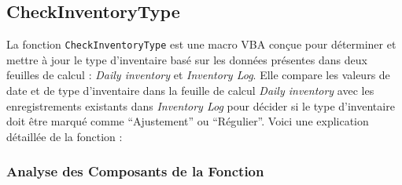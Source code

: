 \documentclass[a4paper, oneside, 12pt, final]{extreport}
\begin{document}
\subsection{CheckInventoryType}

La fonction \texttt{CheckInventoryType} est une macro VBA conçue pour déterminer et mettre à jour le type d'inventaire basé sur les données présentes dans deux feuilles de calcul : \textit{Daily inventory} et \textit{Inventory Log}. Elle compare les valeurs de date et de type d'inventaire dans la feuille de calcul \textit{Daily inventory} avec les enregistrements existants dans \textit{Inventory Log} pour décider si le type d'inventaire doit être marqué comme ``Ajustement'' ou ``Régulier''. Voici une explication détaillée de la fonction :


\subsubsection{Analyse des Composants de la Fonction}
\end{document}
